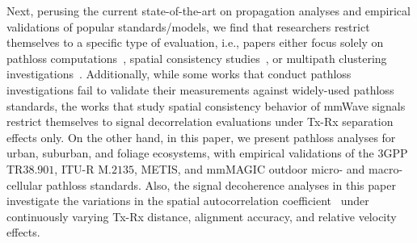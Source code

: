 \documentclass[12pt, draftcls, onecolumn]{IEEEtran}
\begin{document}
Next, perusing the current state-of-the-art on propagation analyses and empirical validations of popular standards/models, we find that researchers restrict themselves to a specific type of evaluation, i.e., papers either focus solely on pathloss computations~\cite{Qualcomm3GPP, MacCartneyModelsOverview, MacCartneyRural, FoliageSimulations, SuburbanGeometryJournal}, spatial consistency studies~\cite{SpatialConsistencyOriginal}, or multipath clustering investigations~\cite{QDC_NIST, D2DHumanBlockage}. Additionally, while some works that conduct pathloss investigations fail to validate their measurements against widely-used pathloss standards, the works that study spatial consistency behavior of mmWave signals restrict themselves to signal decorrelation evaluations under Tx-Rx separation effects only. On the other hand, in this paper, we present pathloss analyses for urban, suburban, and foliage ecosystems, with empirical validations of the $3$GPP TR$38.901$, ITU-R M$.2135$, METIS, and mmMAGIC outdoor micro- and macro-cellular pathloss standards. Also, the signal decoherence analyses in this paper investigate the variations in the spatial autocorrelation coefficient~\cite{SpatialConsistencyOriginal} under continuously varying Tx-Rx distance, alignment accuracy, and relative velocity effects.
\end{document}
